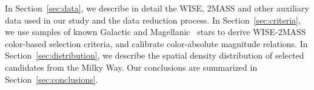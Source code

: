 In Section~\ref{sec:data}, we describe in detail the WISE, 2MASS and other auxiliary data used in our study and the data reduction process. 
In Section~\ref{sec:criteria}, we use samples of known Galactic and Magellanic \agb\, stars to derive 
WISE-2MASS color-based selection criteria, and calibrate color-absolute magnitude relations. 
In Section~\ref{sec:distribution}, we describe the spatial density distribution of selected \agb\, candidates
from the Milky Way. Our conclusions are summarized in Section~\ref{sec:conclusions}.

